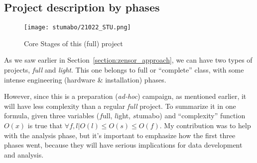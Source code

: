 \subsection{Project description by phases}
\begin{figure}[ht]
    \texttt{[image: stumabo/21022\_STU.png]}
    \caption{Core Stages of this (full) project}
    \label{fig:stumabo_stages}
\end{figure}
As we saw earlier in Section~\ref{section:zensor_approach}, we can have two types of projects, \textit{full} and \textit{light}.
This one belongs to full or ``complete'' class, with some intense engineering (hardware \& installation) phases.  
 \\

However, since this is a preparation (\textit{ad-hoc}) campaign, as mentioned earlier, it will have less complexity than a regular \textit{full} project.
To summarize it in one formula, given three variables ($f$ull, $l$ight, $s$tumabo) and ``complexity'' function $O(x)$ is true that $\forall f,l| O(l) \leq O(s) \leq O(f)$.
My contribution was to help with the analysis phase, but it's important to emphasize how the first three phases went, because they will have serious implications for data development and analysis.
